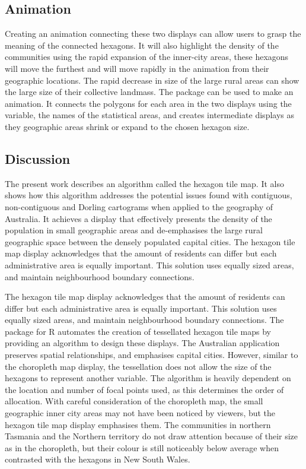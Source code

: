 \hypertarget{animation}{%
\subsection{Animation}\label{animation}}

Creating an animation connecting these two displays can allow users to
grasp the meaning of the connected hexagons. It will also highlight the
density of the communities using the rapid expansion of the inner-city
areas, these hexagons will move the furthest and will move rapidly in
the animation from their geographic locations. The rapid decrease in
size of the large rural areas can show the large size of their
collective landmass. The  \citep{gganimate} package
can be used to make an animation. It connects the polygons for each area
in the two displays using the  variable, the names of the
statistical areas, and creates intermediate displays as they geographic
areas shrink or expand to the chosen hexagon size.

\hypertarget{discussion}{%
\subsection{Discussion}\label{discussion}}

The present work describes an algorithm called the hexagon tile map. It
also shows how this algorithm addresses the potential issues found with
contiguous, non-contiguous and Dorling cartograms when applied to the
geography of Australia. It achieves a display that effectively presents
the density of the population in small geographic areas and
de-emphasises the large rural geographic space between the densely
populated capital cities. The hexagon tile map display acknowledges that
the amount of residents can differ but each administrative area is
equally important. This solution uses equally sized areas, and maintain
neighbourhood boundary connections.

The hexagon tile map display acknowledges that the amount of residents
can differ but each administrative area is equally important. This
solution uses equally sized areas, and maintain neighbourhood boundary
connections. The  package for R automates the creation of
tessellated hexagon tile maps by providing an algorithm to design these
displays. The Australian application preserves spatial relationships,
and emphasises capital cities. However, similar to the choropleth map
display, the tessellation does not allow the size of the hexagons to
represent another variable. The algorithm is heavily dependent on the
location and number of focal points used, as this determines the order
of allocation. With careful consideration of the choropleth map, the
small geographic inner city areas may not have been noticed by viewers,
but the hexagon tile map display emphasises them. The communities in
northern Tasmania and the Northern territory do not draw attention
because of their size as in the choropleth, but their colour is still
noticeably below average when contrasted with the hexagons in New South
Wales.

